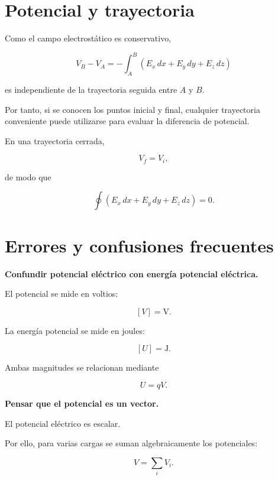 \section{Potencial y trayectoria}

Como el campo electrostático es conservativo,

\[
V_B-V_A
=
-\int_A^B
\left(
E_x\,dx+E_y\,dy+E_z\,dz
\right)
\]

es independiente de la trayectoria seguida entre \(A\) y \(B\).

Por tanto, si se conocen los puntos inicial y final, cualquier trayectoria conveniente
puede utilizarse para evaluar la diferencia de potencial.

En una trayectoria cerrada,

\[
V_f=V_i,
\]

de modo que

\begin{equation}
\boxed{
\oint
\left(
E_x\,dx+E_y\,dy+E_z\,dz
\right)=0
}.
\end{equation}


\section{Errores y confusiones frecuentes}

\begin{errorfrecuente}

\textbf{Confundir potencial eléctrico con energía potencial eléctrica.}

El potencial se mide en voltios:

\[
[V]=\si{\volt}.
\]

La energía potencial se mide en joules:

\[
[U]=\si{\joule}.
\]

Ambas magnitudes se relacionan mediante

\[
U=qV.
\]

\end{errorfrecuente}


\begin{errorfrecuente}

\textbf{Pensar que el potencial es un vector.}

El potencial eléctrico es escalar.

Por ello, para varias cargas se suman algebraicamente los potenciales:

\[
V=\sum_iV_i.
\]

\end{errorfrecuente}


